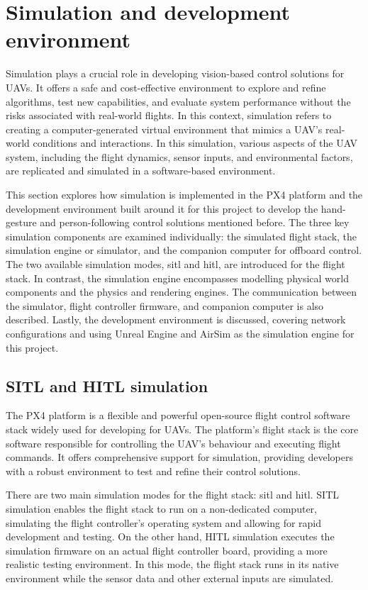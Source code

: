 
\section{Simulation and development environment}
\label{sec:devenv}
Simulation plays a crucial role in developing vision-based control solutions for UAVs. It offers a safe and cost-effective environment to explore and refine algorithms, test new capabilities, and evaluate system performance without the risks associated with real-world flights. 
In this context, simulation refers to creating a computer-generated virtual environment that mimics a UAV's real-world conditions and interactions. In this simulation, various aspects of the UAV system, including the flight dynamics, sensor inputs, and environmental factors, are replicated and simulated in a software-based environment.

This section explores how simulation is implemented in the PX4 platform and the development environment built around it for this project to develop the hand-gesture and person-following control solutions mentioned before.
The three key simulation components are examined individually: the simulated flight stack, the simulation engine or simulator, and the companion computer for offboard control. 
The two available simulation modes, \acrfull{sitl} and \acrfull{hitl}, are introduced for the flight stack. In contrast, the simulation engine encompasses modelling physical world components and the physics and rendering engines. 
The communication between the simulator, flight controller firmware, and companion computer is also described. 
Lastly, the development environment is discussed, covering network configurations and using Unreal Engine and AirSim as the simulation engine for this project.

\subsection{SITL and HITL simulation}

The PX4 platform is a flexible and powerful open-source flight control software stack widely used for developing for UAVs. The platform’s flight stack is the core software responsible for controlling the UAV's behaviour and executing flight commands. It offers comprehensive support for simulation, providing developers with a robust environment to test and refine their control solutions.

There are two main simulation modes for the flight stack: \acrfull{sitl} and \acrfull{hitl}. SITL simulation enables the flight stack to run on a non-dedicated computer, simulating the flight controller’s operating system and allowing for rapid development and testing. On the other hand, HITL simulation executes the simulation firmware on an actual flight controller board, providing a more realistic testing environment. In this mode, the flight stack runs in its native environment while the sensor data and other external inputs are simulated.


